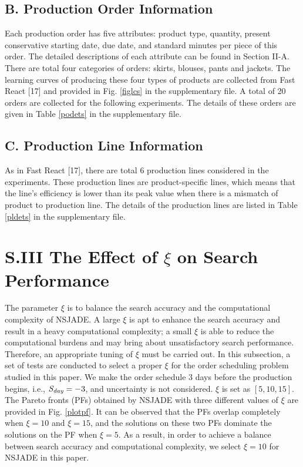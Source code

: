 \documentclass[journal]{IEEEtran}
\theoremstyle{definition}
\begin{document}
\subsection*{B. Production Order Information}
Each production order has five attributes: product type, quantity, present conservative starting date, due date, and standard minutes per piece of this order. The detailed descriptions of each attribute can be found in Section II-A.
There are total four categories of orders: skirts, blouses, pants and jackets. The learning curves of producing these four types of products are collected from Fast React [17] and provided in Fig. \ref{figlcs} in the supplementary file. A total of 20 orders are collected for the following experiments. The details of these orders are given in Table \ref{podets} in the supplementary file.

\subsection*{C. Production Line Information}
As in Fast React [17], there are total 6 production lines considered in the experiments. These production lines are product-specific lines, which means that the line's efficiency is lower than its peak value when there is a mismatch of product to production line. The details of the production lines are listed in Table \ref{pldets} in the supplementary file.

\section*{S.III The Effect of $\xi$ on Search Performance}
The parameter $\xi$ is to balance the search accuracy and the computational complexity of NSJADE. A large $\xi$ is apt to enhance the search accuracy and result in a heavy computational complexity; a small $\xi$ is able to reduce the computational burdens and may bring about unsatisfactory search performance. Therefore, an appropriate tuning of $\xi$ must be carried out. In this subsection, a set of tests are conducted to select a proper $\xi$ for the order scheduling problem studied in this paper. We make the order schedule 3 days before the production begins, i.e., $\emph{S}_\emph{day}=-3$, and uncertainty is not considered. $\xi$ is set as $[5, 10, 15]$. The Pareto fronts (PFs) obtained by NSJADE with three different values of $\xi$ are provided in Fig. \ref{plotpf}.
It can be observed that the PFs overlap completely when $\xi=10$ and $\xi=15$, and the solutions on these two PFs dominate the solutions on the PF when $\xi=5$. As a result, in order to achieve a balance between search accuracy and computational complexity, we select $\xi=10$ for NSJADE in this paper.
\end{document}
